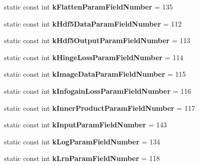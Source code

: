 \begin{DoxyCompactItemize}
static const int {\bfseries k\+Flatten\+Param\+Field\+Number} = 135
\item 
\mbox{\label{classcaffe_1_1_layer_parameter_abbb8edd9ca061480411d3b3709811dca}} 
static const int {\bfseries k\+Hdf5\+Data\+Param\+Field\+Number} = 112
\item 
\mbox{\label{classcaffe_1_1_layer_parameter_a3780741153ed38b75d15092b515a24ae}} 
static const int {\bfseries k\+Hdf5\+Output\+Param\+Field\+Number} = 113
\item 
\mbox{\label{classcaffe_1_1_layer_parameter_abfabb4f8a92c044c0dc86423d94104ec}} 
static const int {\bfseries k\+Hinge\+Loss\+Param\+Field\+Number} = 114
\item 
\mbox{\label{classcaffe_1_1_layer_parameter_a471b04f346e44c3639f9318c96f8c12a}} 
static const int {\bfseries k\+Image\+Data\+Param\+Field\+Number} = 115
\item 
\mbox{\label{classcaffe_1_1_layer_parameter_a2bcdc6e6da93288ffd44d10d2534b28b}} 
static const int {\bfseries k\+Infogain\+Loss\+Param\+Field\+Number} = 116
\item 
\mbox{\label{classcaffe_1_1_layer_parameter_a2165871af7556fffe481eb6e54b45f6c}} 
static const int {\bfseries k\+Inner\+Product\+Param\+Field\+Number} = 117
\item 
\mbox{\label{classcaffe_1_1_layer_parameter_a880a82630df6661d926ac73ab3df0d64}} 
static const int {\bfseries k\+Input\+Param\+Field\+Number} = 143
\item 
\mbox{\label{classcaffe_1_1_layer_parameter_a165d0526046e30d6ae8e77e118e064f1}} 
static const int {\bfseries k\+Log\+Param\+Field\+Number} = 134
\item 
\mbox{\label{classcaffe_1_1_layer_parameter_adef61bdeb3bd38e34e5bece2f1ceb37a}} 
static const int {\bfseries k\+Lrn\+Param\+Field\+Number} = 118
\item 

\end{DoxyCompactItemize}
